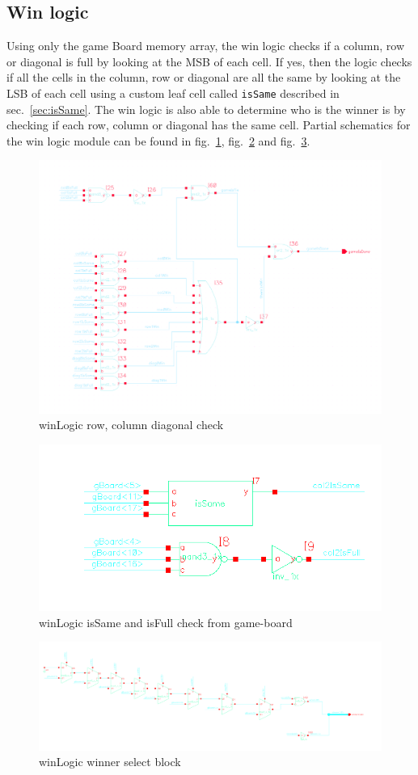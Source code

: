 \documentclass[]{article}
\begin{document}
\subsection{Win logic}
Using only the game Board memory array, the win logic checks if a column, row or diagonal is full by looking at the MSB of each cell. If yes, then the logic checks if all the cells in the column, row or diagonal are all the same by looking at the LSB of each cell using a custom  leaf cell called \texttt{isSame} described in sec.~\ref{sec:isSame}. The win logic is also able to determine who is the winner is by checking if each row, column or diagonal has the same cell. Partial schematics for the win logic module can be found in fig.~\ref{fig:winLogic-schem1}, fig.~\ref{fig:winLogic-schem2} and fig.~\ref{fig:winLogic-schem3}.
\begin{figure}
\centering
\includegraphics[width=.2\textwidth]{winLogic-schem_1}
\caption{winLogic row, column diagonal check}
\label{fig:winLogic-schem1}
\end{figure}

\begin{figure}
\centering
\includegraphics[width=.5\textwidth]{winLogic-schem_2}
\caption{winLogic isSame and isFull check from game-board}
\label{fig:winLogic-schem2}
\end{figure}

\begin{figure}
\centering
\includegraphics[width=.8\textwidth]{winLogic-schem_3}
\caption{winLogic winner select block}
\label{fig:winLogic-schem3}
\end{figure}
\end{document}
